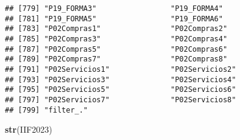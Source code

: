 \documentclass[
]{article}
\newenvironment{Shaded}{\begin{snugshade}}{\end{snugshade}}
\newcommand{\FunctionTok}[1]{\textcolor[rgb]{0.13,0.29,0.53}{\textbf{#1}}}
\newcommand{\NormalTok}[1]{#1}
\begin{document}
\begin{verbatim}
## [779] "P19_FORMA3"                 "P19_FORMA4"                
## [781] "P19_FORMA5"                 "P19_FORMA6"                
## [783] "P02Compras1"                "P02Compras2"               
## [785] "P02Compras3"                "P02Compras4"               
## [787] "P02Compras5"                "P02Compras6"               
## [789] "P02Compras7"                "P02Compras8"               
## [791] "P02Servicios1"              "P02Servicios2"             
## [793] "P02Servicios3"              "P02Servicios4"             
## [795] "P02Servicios5"              "P02Servicios6"             
## [797] "P02Servicios7"              "P02Servicios8"             
## [799] "filter_."
\end{verbatim}

\begin{Shaded}
\begin{Highlighting}[]
\FunctionTok{str}\NormalTok{(IIF2023) }
\end{Highlighting}
\end{Shaded}
\end{document}
